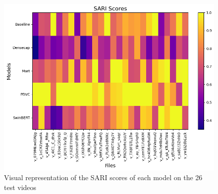 \begin{figure}[htbp]
\centering
\centerline{\includegraphics[scale=0.38]{images/sari scores.png}}
\captionsetup{justification=centering}
\caption{Visual representation of the SARI scores of each model on the 26 test videos}
\label{sari-scores}
\end{figure}

